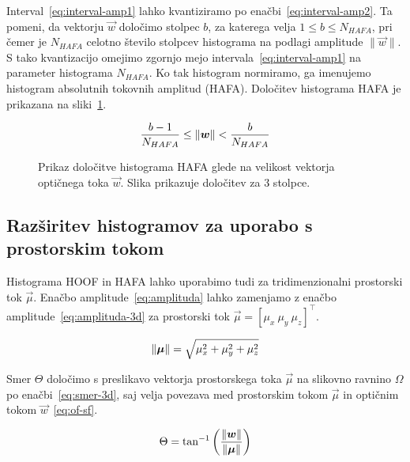Interval~\eqref{eq:interval-amp1} lahko kvantiziramo po enačbi~\eqref{eq:interval-amp2}. Ta pomeni, da vektorju $\vec{w}$ določimo stolpec $b$, za katerega velja $1 \leq b \leq N_{HAFA}$, pri čemer je $N_{HAFA}$ celotno število stolpcev histograma na podlagi amplitude $\| \vec{w} \|$. S tako kvantizacijo omejimo zgornjo mejo intervala~\eqref{eq:interval-amp1} na parameter histograma $N_{HAFA}$. Ko tak histogram normiramo, ga imenujemo histogram absolutnih tokovnih amplitud (HAFA). Določitev histograma HAFA je prikazana na sliki~\ref{fig:hafa-histogram}.

\begin{equation}\label{eq:interval-amp2}
	\frac{b-1}{N_{HAFA}} \leq \left\lVert {\boldsymbol{w}} \right\rVert < \frac{b}{N_{HAFA}}
\end{equation}




\begin{figure}[!htb]
\centering
\resizebox{0.5\columnwidth}{!}{}
\caption[Prikaz določitve histograma HAFA glede na velikost vektorja]{Prikaz določitve histograma HAFA glede na velikost vektorja optičnega toka $\vec{w}$. Slika prikazuje določitev za $3$ stolpce.}
\label{fig:hafa-histogram}
\end{figure}



\subsection{Razširitev histogramov za uporabo s prostorskim tokom}
Histograma HOOF in HAFA lahko uporabimo tudi za tridimenzionalni prostorski tok $\vec{\mu}$. Enačbo amplitude~\eqref{eq:amplituda} lahko zamenjamo z enačbo amplitude~\eqref{eq:amplituda-3d} za prostorski tok $\vec{\mu} = \left[\mu_x~\mu_y~\mu_z \right]^\top$.

\begin{equation}
\left\lVert {\boldsymbol{\mu}} \right\rVert = \sqrt{\mu_x^2 + \mu_y^2 + \mu_z^2} 
\label{eq:amplituda-3d}
\end{equation}

Smer $\Theta$ določimo s preslikavo vektorja prostorskega toka $\vec{\mu}$ na slikovno ravnino $\varOmega$ po enačbi~\eqref{eq:smer-3d}, saj velja povezava med prostorskim tokom $\vec{\mu}$ in optičnim tokom $\vec{w}$~\eqref{eq:of-sf}.


\begin{equation}
\Theta = \tan^{-1}\left( \frac{\left\lVert {\boldsymbol{w}} \right\rVert}{\left\lVert {\boldsymbol{\mu}} \right\rVert} \right)
\label{eq:smer-3d}
\end{equation}

